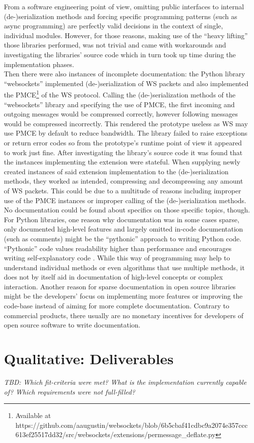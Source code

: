 From a software engineering point of view, omitting public interfaces to internal (de-)serialization methods and forcing specific programming patterns (such as async programming) are perfectly valid decisions in the context of single, individual modules. However, for those reasons, making use of the \enquote{heavy lifting} those libraries performed, was not trivial and came with workarounds and investigating the libraries' source code which in turn took up time during the implementation phases.\\
Then there were also instances of incomplete documentation: the Python library \enquote{websockets} implemented (de-)serialization of \ac{WS} packets and also implemented the \ac{PMCE}\footnote{Available at https://github.com/aaugustin/websockets/blob/6b5cbaf41cdbc9a2074e357ccc613ef25517dd32/src/websockets/extensions/permessage\_deflate.py} of the \ac{WS} protocol. Calling the (de-)serialization methods of the \enquote{websockets} library and specifying the use of \ac{PMCE}, the first incoming and outgoing messages would be compressed correctly, however following messages would be compressed incorrectly. This rendered the prototype useless as \ac{WS} may use \ac{PMCE} by default to reduce bandwidth. The library failed to raise exceptions or return error codes so from the prototype's runtime point of view it appeared to work just fine. After investigating the library's source code it was found that the instances implementing the extension were stateful. When supplying newly created instances of said extension implementation to the (de-)serialization methods, they worked as intended, compressing and decompressing any amount of \ac{WS} packets. This could be due to a multitude of reasons including improper use of the \ac{PMCE} instances or improper calling of the (de-)serialization methods. No documentation could be found about specifics on those specific topics, though.\\
For Python libraries, one reason why documentation was in some cases sparse, only documented high-level features and largely omitted in-code documentation (such as comments) might be the \enquote{pythonic} approach to writing Python code. \enquote{Pythonic} code values readability higher than performance and encourages writing self-explanatory code%
. While this way of programming may help to understand individual methods or even algorithms that use multiple methods, it does not by itself aid in documentation of high-level concepts or complex interaction. Another reason for sparse documentation in open source libraries might be the developers' focus on implementing more features or improving the code-base instead of aiming for more complete documentation. Contrary to commercial products, there usually are no monetary incentives for developers of open source software to write documentation.

\section{Qualitative: Deliverables}
\label{sec:pm-deliverables}
\emph{TBD: Which fit-criteria were met? What is the implementation currently capable of? Which requirements were not full-filled?}